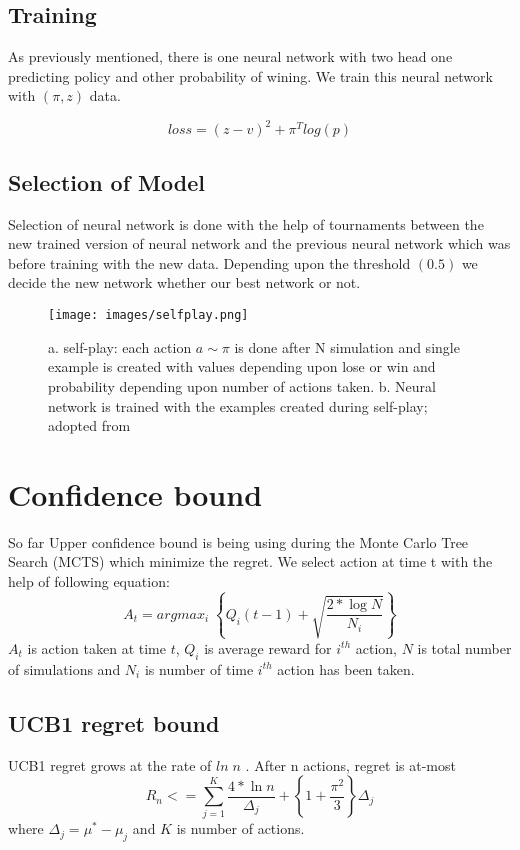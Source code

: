 \subsection{Training}
As previously mentioned, there is one neural network with two head one predicting policy and other probability of wining. We train this neural network with $(\pi,z)$ data. 


$$loss = (z-v)^{2} + \pi^{T}log(p)$$ 
\subsection{Selection of Model}
Selection of neural network is done with the help of tournaments between the new trained version of neural network and the previous neural network which was before training with the new data. Depending upon the threshold $(0.5)$ we decide the new network whether our best network or not.

\begin{figure}
    [!htb]\centering
    \texttt{[image: images/selfplay.png]}
    \caption{a. self-play: each action $a \sim \pi $ is done after N simulation and single example is created with values depending upon lose or win and probability depending upon number of actions taken. b. Neural network is trained with the examples created during self-play;  adopted from \cite{alphagozerofig}  }
  \label{fig:phase}
  \end{figure}

\section{Confidence bound}
So far Upper confidence bound is being using during the Monte Carlo Tree Search (MCTS)\cite{mcts} which minimize the regret. We select action at time t with the help of following equation: $$ A_{t} = argmax_{i}\; \left \lbrace Q_{i}(t-1) + \sqrt{\dfrac{2* \log N}{N_{i}}} \right \rbrace $$
$A_{t}$ is action taken at time $t$, $Q_{i}$ is average reward for $i^{th}$ action, $N$ is total number of simulations and $N_{i}$ is number of time $i^{th}$ action has been taken.

\subsection{UCB1 regret bound}



UCB1 regret grows at the rate of \textbf{ $ln \;n$} .  After n actions, regret is at-most 
$$
R_{n} <= \sum_{j=1}^{K} \dfrac{4* \ln{n}}{\Delta_{j}} + \left \lbrace 1 + \dfrac{\pi^{2}}{3} \right \rbrace \Delta_{j} 
$$    
where $\Delta_{j} = \mu^{*} - \mu_{j}$  and $K$ is number of actions.

